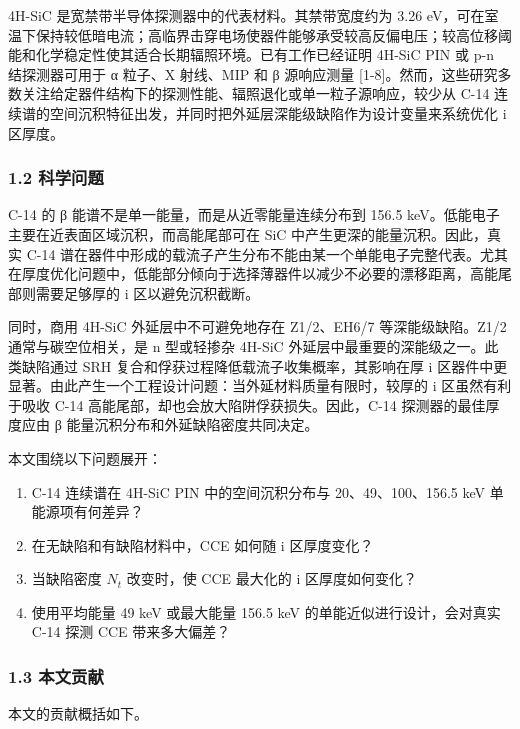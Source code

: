 \documentclass[
  10pt,
  a4paper,
]{ctexart}
\providecommand{\tightlist}{%
  \setlength{\itemsep}{0pt}\setlength{\parskip}{0pt}}
\begin{document}
4H-SiC 是宽禁带半导体探测器中的代表材料。其禁带宽度约为 3.26
eV，可在室温下保持较低暗电流；高临界击穿电场使器件能够承受较高反偏电压；较高位移阈能和化学稳定性使其适合长期辐照环境。已有工作已经证明
4H-SiC PIN 或 p-n 结探测器可用于 α 粒子、X 射线、MIP 和 β 源响应测量
{[}1-8{]}。然而，这些研究多数关注给定器件结构下的探测性能、辐照退化或单一粒子源响应，较少从
C-14
连续谱的空间沉积特征出发，并同时把外延层深能级缺陷作为设计变量来系统优化
i 区厚度。

\subsubsection{1.2 科学问题}\label{ux79d1ux5b66ux95eeux9898}

C-14 的 β 能谱不是单一能量，而是从近零能量连续分布到 156.5
keV。低能电子主要在近表面区域沉积，而高能尾部可在 SiC
中产生更深的能量沉积。因此，真实 C-14
谱在器件中形成的载流子产生分布不能由某一个单能电子完整代表。尤其在厚度优化问题中，低能部分倾向于选择薄器件以减少不必要的漂移距离，高能尾部则需要足够厚的
i 区以避免沉积截断。

同时，商用 4H-SiC 外延层中不可避免地存在 Z1/2、EH6/7 等深能级缺陷。Z1/2
通常与碳空位相关，是 n 型或轻掺杂 4H-SiC
外延层中最重要的深能级之一。此类缺陷通过 SRH
复合和俘获过程降低载流子收集概率，其影响在厚 i
区器件中更显著。由此产生一个工程设计问题：当外延材料质量有限时，较厚的 i
区虽然有利于吸收 C-14 高能尾部，却也会放大陷阱俘获损失。因此，C-14
探测器的最佳厚度应由 β 能量沉积分布和外延缺陷密度共同决定。

本文围绕以下问题展开：

\begin{enumerate}
\def\labelenumi{\arabic{enumi}.}
\tightlist
\item
  C-14 连续谱在 4H-SiC PIN 中的空间沉积分布与 20、49、100、156.5 keV
  单能源项有何差异？
\item
  在无缺陷和有缺陷材料中，CCE 如何随 i 区厚度变化？
\item
  当缺陷密度 \(N_t\) 改变时，使 CCE 最大化的 i 区厚度如何变化？
\item
  使用平均能量 49 keV 或最大能量 156.5 keV 的单能近似进行设计，会对真实
  C-14 探测 CCE 带来多大偏差？
\end{enumerate}

\subsubsection{1.3 本文贡献}\label{ux672cux6587ux8d21ux732e}

本文的贡献概括如下。
\end{document}
